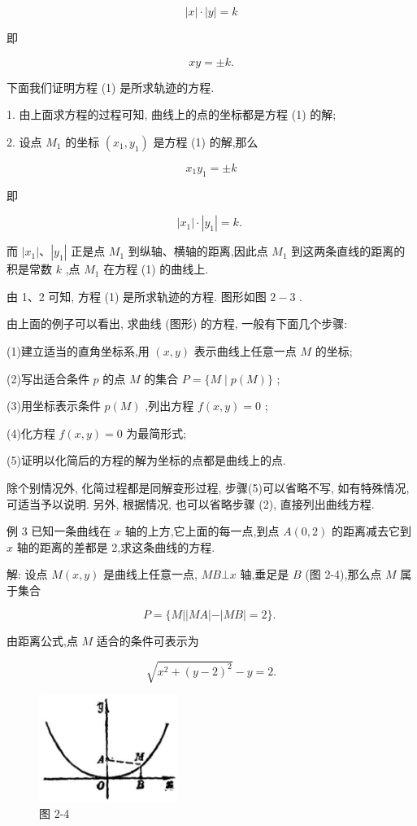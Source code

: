 \documentclass[lang=cn,newtx,10.5pt,scheme=chinese]{elegantbook}
\begin{document}
\[
  \left| x\right| \cdot \left| y\right| = k
\]

即

\[
    {xy} = \pm k\text{.} \tag{1}
\]

下面我们证明方程 (1) 是所求轨迹的方程.

1. 由上面求方程的过程可知, 曲线上的点的坐标都是方程 (1) 的解;

2. 设点 \({M}_{1}\) 的坐标 \(\left( {{x}_{1},{y}_{1}}\right)\) 是方程 (1) 的解,那么

\[
    {x}_{1}{y}_{1} = \pm k
\]

即

\[
  \left| {x}_{1}\right| \cdot \left| {y}_{1}\right| = k\text{. }
\]

而 \(\left| {x}_{1}\right| \text{、}\left| {y}_{1}\right|\) 正是点 \({M}_{1}\) 到纵轴、横轴的距离,因此点 \({M}_{1}\) 到这两条直线的距离的积是常数 \(k\) ,点 \({M}_{1}\) 在方程 (1) 的曲线上.

由 1、2 可知, 方程 (1) 是所求轨迹的方程. 图形如图 \(2 - 3\) .

由上面的例子可以看出, 求曲线 (图形) 的方程, 一般有下面几个步骤:

(1)建立适当的直角坐标系,用 \(\left( {x,y}\right)\) 表示曲线上任意一点 \(M\) 的坐标;

(2)写出适合条件 \(p\) 的点 \(M\) 的集合 \(P = \{ M \mid p\left( M\right) \}\) ;

(3)用坐标表示条件 \(p\left( M\right)\) ,列出方程 \(f\left( {x,y}\right) = 0\) ;

(4)化方程 \(f\left( {x,y}\right) = 0\) 为最简形式;

(5)证明以化简后的方程的解为坐标的点都是曲线上的点.

除个别情况外, 化简过程都是同解变形过程, 步骤(5)可以省略不写, 如有特殊情况, 可适当予以说明. 另外, 根据情况, 也可以省略步骤 (2), 直接列出曲线方程.

例 3 已知一条曲线在 \(x\) 轴的上方,它上面的每一点,到点 \(A\left( {0,2}\right)\) 的距离减去它到 \(x\) 轴的距离的差都是 2,求这条曲线的方程.

解: 设点 \(M\left( {x,y}\right)\) 是曲线上任意一点, \({MB} \bot x\) 轴,垂足是 \(B\) (图 2-4),那么点 \(M\) 属于集合

\[
  P = \{ M\left| \right| {MA}\left| -\right| {MB} \mid = 2\} \text{. }
\]

由距离公式,点 \(M\) 适合的条件可表示为

\[
  \sqrt{{x}^{2} + {\left( y - 2\right) }^{2}} - y = 2. \tag{1}
\]

\begin{figure}[h]
  \centering
  \includegraphics[max width=0.4\textwidth]{images/01912cc2-ffb6-728e-9ae7-b113ff05c64b_70_664169.jpg}
  \caption{图 2-4}
\end{figure}
\end{document}
